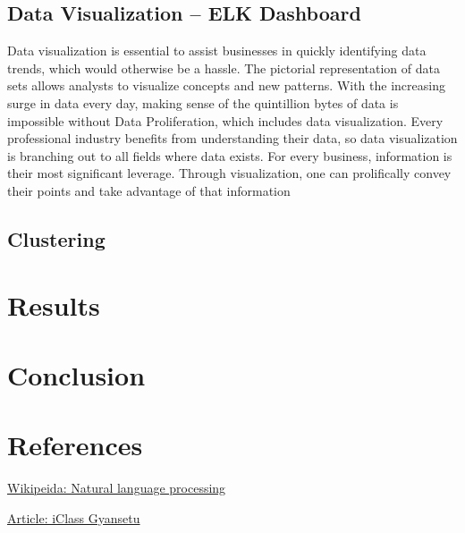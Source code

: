 \documentclass[a4paper,12pt]{report}
\begin{document}
    \section{Data Visualization – ELK Dashboard}

    Data visualization is essential to assist businesses in quickly identifying data trends, which would otherwise be a hassle. The pictorial representation of data sets allows analysts to visualize concepts and new patterns. With the increasing surge in data every day, making sense of the quintillion bytes of data is impossible without Data Proliferation, which includes data visualization.
    \newline
    Every professional industry benefits from understanding their data, so data visualization is branching out to all fields where data exists. For every business, information is their most significant leverage. Through visualization, one can prolifically convey their points and take advantage of that information


    \section{Clustering}

    \chapter{Results}


    
    \chapter{Conclusion}

    
    \chapter{References}


    \begin{thebibliography}{9}
        \href{https://en.wikipedia.org/wiki/Natural_language_processing}{Wikipeida: Natural language processing}

        
        \href{https://www.gyansetu.in/what-is-natural-language-processing/}{Article: iClass Gyansetu}
    \end{thebibliography}
\end{document}
